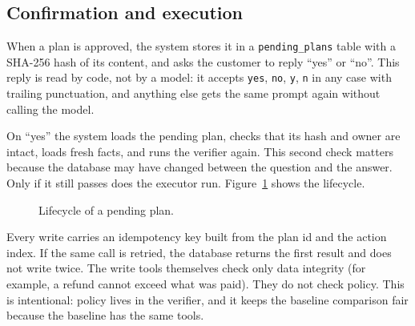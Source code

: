 \documentclass[11pt,a4paper]{article}
\begin{document}
\subsection{Confirmation and execution}
When a plan is approved, the system stores it in a \texttt{pending\_plans} table with a SHA-256 hash of its content, and asks the customer to reply ``yes'' or ``no''. This reply is read by code, not by a model: it accepts \texttt{yes}, \texttt{no}, \texttt{y}, \texttt{n} in any case with trailing punctuation, and anything else gets the same prompt again without calling the model.

On ``yes'' the system loads the pending plan, checks that its hash and owner are intact, loads fresh facts, and runs the verifier again. This second check matters because the database may have changed between the question and the answer. Only if it still passes does the executor run. Figure~\ref{fig:confirm} shows the lifecycle.

\begin{figure}[H]
\centering
{}
\caption{Lifecycle of a pending plan.}
\label{fig:confirm}
\end{figure}

Every write carries an idempotency key built from the plan id and the action index. If the same call is retried, the database returns the first result and does not write twice. The write tools themselves check only data integrity (for example, a refund cannot exceed what was paid). They do not check policy. This is intentional: policy lives in the verifier, and it keeps the baseline comparison fair because the baseline has the same tools.
\end{document}
